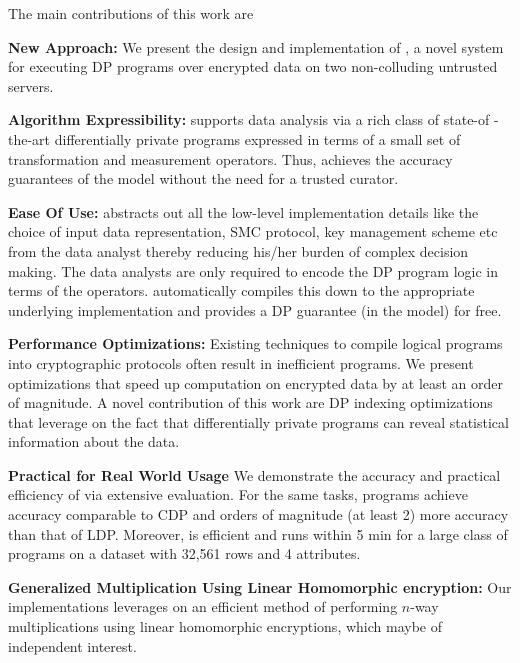 The main contributions of this work are
\squishlist
\item \textbf{New Approach:} We present the design and implementation of \system, a novel system for executing DP programs over encrypted data on two non-colluding untrusted servers. %
\item \textbf{Algorithm Expressibility:} \system supports data analysis via a rich class of state-of -the-art differentially private programs expressed in terms of a small set of transformation and measurement operators. Thus, \system achieves the accuracy guarantees of the \cdp model without the need for a trusted curator.  
\item \textbf{Ease Of Use:} \system abstracts out all the low-level implementation details like the choice of input data representation, SMC protocol, key management scheme etc from the data analyst thereby reducing his/her burden of complex decision making. The data analysts are only required to encode the DP program logic in terms of the \system operators. \system automatically compiles this down to the appropriate underlying implementation and provides a DP guarantee (in the \cdp model) for free. 
\item \textbf{Performance Optimizations:} Existing techniques to compile logical \system programs into cryptographic protocols often result in inefficient programs. We present optimizations that speed up computation on encrypted data by at least an order of magnitude. A novel contribution of this work are DP indexing optimizations that leverage on the fact that differentially private programs can reveal statistical information about the data. 
\item \textbf{Practical for Real World Usage} We demonstrate the accuracy and practical efficiency of \system via extensive  evaluation. For the same tasks, \system programs achieve accuracy comparable to \textsf{CDP} and orders of magnitude (at least 2) more accuracy than that of \textsf{LDP}. Moreover, \system is efficient and runs within 5 min for a large class of programs on a dataset with 32,561 rows and 4 attributes. 
\item \textbf{Generalized Multiplication Using Linear Homomorphic encryption:} Our implementations leverages on an efficient method of performing $n$-way multiplications using linear homomorphic encryptions, which maybe of independent interest.
\squishend

